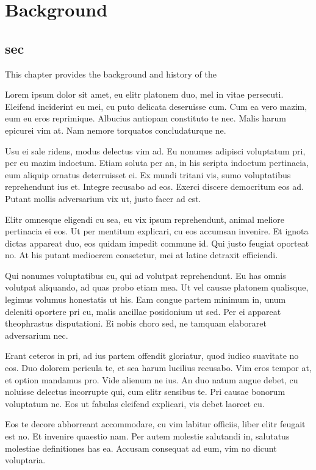 \chapter{Background}
\minitoc
\section{sec}
This chapter provides the background and history of the

Lorem ipsum dolor sit amet, eu elitr platonem duo, mel in vitae persecuti. Eleifend inciderint eu mei, cu puto delicata deseruisse cum. Cum ea vero mazim, eum eu eros reprimique. Albucius antiopam constituto te nec. Malis harum epicurei vim at. Nam nemore torquatos concludaturque ne.

Usu ei sale ridens, modus delectus vim ad. Eu nonumes adipisci voluptatum pri, per eu mazim indoctum. Etiam soluta per an, in his scripta indoctum pertinacia, eum aliquip ornatus deterruisset ei. Ex mundi tritani vis, sumo voluptatibus reprehendunt ius et. Integre recusabo ad eos. Exerci discere democritum eos ad. Putant mollis adversarium vix ut, justo facer ad est.

Elitr omnesque eligendi cu sea, eu vix ipsum reprehendunt, animal meliore pertinacia ei eos. Ut per mentitum explicari, cu eos accumsan invenire. Et ignota dictas appareat duo, eos quidam impedit commune id. Qui justo feugiat oporteat no. At his putant mediocrem consetetur, mei at latine detraxit efficiendi.

Qui nonumes voluptatibus cu, qui ad volutpat reprehendunt. Eu has omnis volutpat aliquando, ad quas probo etiam mea. Ut vel causae platonem qualisque, legimus volumus honestatis ut his. Eam congue partem minimum in, unum deleniti oportere pri cu, malis ancillae posidonium ut sed. Per ei appareat theophrastus disputationi. Ei nobis choro sed, ne tamquam elaboraret adversarium nec.

Erant ceteros in pri, ad ius partem offendit gloriatur, quod iudico suavitate no eos. Duo dolorem pericula te, et sea harum lucilius recusabo. Vim eros tempor at, et option mandamus pro. Vide alienum ne ius. An duo natum augue debet, cu noluisse delectus incorrupte qui, cum elitr sensibus te. Pri causae bonorum voluptatum ne. Eos ut fabulas eleifend explicari, vis debet laoreet cu.

Eos te decore abhorreant accommodare, cu vim labitur officiis, liber elitr feugait est no. Et invenire quaestio nam. Per autem molestie salutandi in, salutatus molestiae definitiones has ea. Accusam consequat ad eum, vim no dicunt voluptaria.

